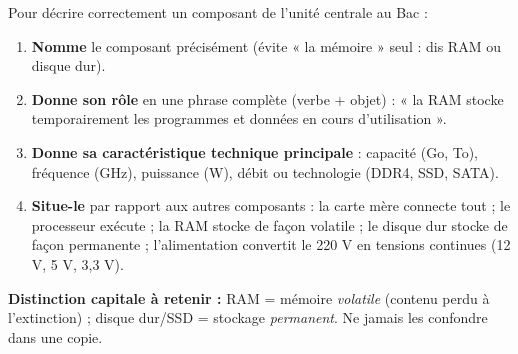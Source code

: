 \documentclass[11pt]{article}
\begin{document}
\begin{methode}
Pour décrire correctement un composant de l'unité centrale au Bac :
\begin{enumerate}
\item \textbf{Nomme} le composant précisément (évite « la mémoire » seul : dis RAM ou disque dur).
\item \textbf{Donne son rôle} en une phrase complète (verbe + objet) : « la RAM stocke temporairement les programmes et données en cours d'utilisation ».
\item \textbf{Donne sa caractéristique technique principale} : capacité (Go, To), fréquence (GHz), puissance (W), débit ou technologie (DDR4, SSD, SATA).
\item \textbf{Situe-le} par rapport aux autres composants : la carte mère connecte tout ; le processeur exécute ; la RAM stocke de façon volatile ; le disque dur stocke de façon permanente ; l'alimentation convertit le 220 V en tensions continues (12 V, 5 V, 3,3 V).
\end{enumerate}
\textbf{Distinction capitale à retenir :} RAM = mémoire \emph{volatile} (contenu perdu à l'extinction) ; disque dur/SSD = stockage \emph{permanent}. Ne jamais les confondre dans une copie.
\end{methode}
\end{document}
